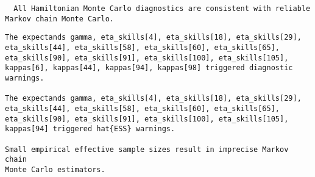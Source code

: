 \documentclass[
  letterpaper,
  DIV=11,
  numbers=noendperiod]{scrartcl}
\newenvironment{Shaded}{\begin{snugshade}}{\end{snugshade}}
\newcommand{\AttributeTok}[1]{\textcolor[rgb]{0.40,0.45,0.13}{#1}}
\newcommand{\ConstantTok}[1]{\textcolor[rgb]{0.56,0.35,0.01}{#1}}
\newcommand{\FunctionTok}[1]{\textcolor[rgb]{0.28,0.35,0.67}{#1}}
\newcommand{\NormalTok}[1]{\textcolor[rgb]{0.00,0.23,0.31}{#1}}
\newcommand{\OtherTok}[1]{\textcolor[rgb]{0.00,0.23,0.31}{#1}}
\newcommand{\SpecialCharTok}[1]{\textcolor[rgb]{0.37,0.37,0.37}{#1}}
\newcommand{\StringTok}[1]{\textcolor[rgb]{0.13,0.47,0.30}{#1}}
\begin{document}
\begin{verbatim}
  All Hamiltonian Monte Carlo diagnostics are consistent with reliable
Markov chain Monte Carlo.
\end{verbatim}

\begin{Shaded}
\end{Shaded}

\begin{verbatim}
The expectands gamma, eta_skills[4], eta_skills[18], eta_skills[29],
eta_skills[44], eta_skills[58], eta_skills[60], eta_skills[65],
eta_skills[90], eta_skills[91], eta_skills[100], eta_skills[105],
kappas[6], kappas[44], kappas[94], kappas[98] triggered diagnostic
warnings.

The expectands gamma, eta_skills[4], eta_skills[18], eta_skills[29],
eta_skills[44], eta_skills[58], eta_skills[60], eta_skills[65],
eta_skills[90], eta_skills[91], eta_skills[100], eta_skills[105],
kappas[94] triggered hat{ESS} warnings.

Small empirical effective sample sizes result in imprecise Markov chain
Monte Carlo estimators.
\end{verbatim}
\end{document}
